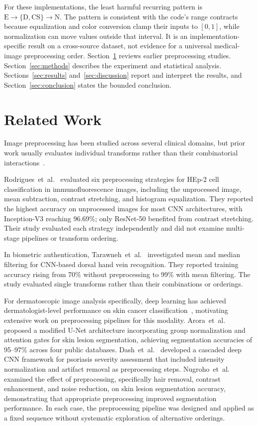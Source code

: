 \documentclass[preprint,review,12pt]{elsarticle}
\begin{document}
For these implementations, the least harmful recurring pattern is $\text{E} \to \{\text{D},\text{CS}\} \to \text{N}$. The pattern is consistent with the code's range contracts because equalization and color conversion clamp their inputs to $[0,1]$, while normalization can move values outside that interval. It is an implementation-specific result on a cross-source dataset, not evidence for a universal medical-image preprocessing order. Section~\ref{sec:related} reviews earlier preprocessing studies. Section~\ref{sec:methods} describes the experiment and statistical analysis. Sections~\ref{sec:results} and~\ref{sec:discussion} report and interpret the results, and Section~\ref{sec:conclusion} states the bounded conclusion.

\section{Related Work}
\label{sec:related}

Image preprocessing has been studied across several clinical domains, but prior work usually evaluates individual transforms rather than their combinatorial interactions~\cite{Koresh2024}.

Rodrigues~et~al.~\cite{RODRIGUES2020103542} evaluated six preprocessing strategies for HEp-2 cell classification in immunofluorescence images, including the unprocessed image, mean subtraction, contrast stretching, and histogram equalization. They reported the highest accuracy on unprocessed images for most CNN architectures, with Inception-V3 reaching 96.69\%; only ResNet-50 benefited from contrast stretching. Their study evaluated each strategy independently and did not examine multi-stage pipelines or transform ordering.

In biometric authentication, Tarawneh~et~al.~\cite{Tarawneh2024} investigated mean and median filtering for CNN-based dorsal hand vein recognition. They reported training accuracy rising from 70\% without preprocessing to 99\% with mean filtering. The study evaluated single transforms rather than their combinations or orderings.

For dermatoscopic image analysis specifically, deep learning has achieved dermatologist-level performance on skin cancer classification~\cite{Esteva2017}, motivating extensive work on preprocessing pipelines for this modality. Arora~et~al.~\cite{ARORA2021102358} proposed a modified U-Net architecture incorporating group normalization and attention gates for skin lesion segmentation, achieving segmentation accuracies of 95--97\% across four public databases. Dash~et~al.~\cite{DASH2020106240} developed a cascaded deep CNN framework for psoriasis severity assessment that included intensity normalization and artifact removal as preprocessing steps. Nugroho~et~al.~\cite{10810559} examined the effect of preprocessing, specifically hair removal, contrast enhancement, and noise reduction, on skin lesion segmentation accuracy, demonstrating that appropriate preprocessing improved segmentation performance. In each case, the preprocessing pipeline was designed and applied as a fixed sequence without systematic exploration of alternative orderings.
\end{document}
